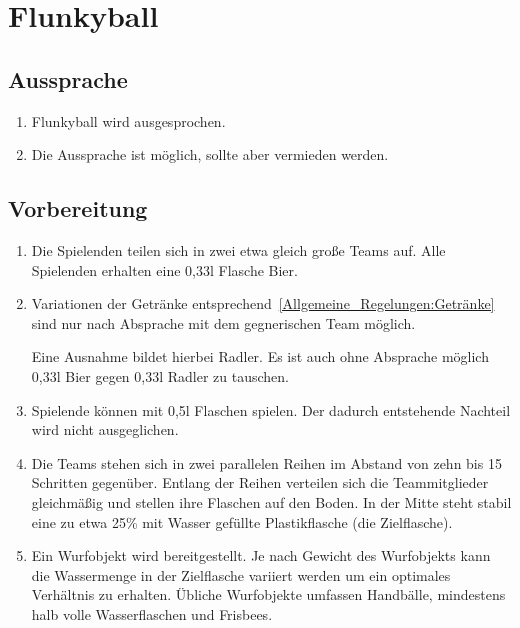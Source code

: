 \chapter{Flunkyball}
\section{Aussprache}
\begin{enumerate}[label={(\arabic*)}]
    \item
    Flunkyball wird  ausgesprochen.

    \item
    Die Aussprache  ist möglich, sollte aber vermieden werden.
\end{enumerate}

\section{Vorbereitung}
\begin{enumerate}[label={(\arabic*)}]
    \item
    Die Spielenden teilen sich in zwei etwa gleich große Teams auf.
    Alle Spielenden erhalten eine 0,33l Flasche Bier.

    \item Variationen der Getränke entsprechend~\ref{Allgemeine_Regelungen:Getränke} sind nur nach Absprache mit dem gegnerischen Team möglich.

    Eine Ausnahme bildet hierbei Radler.
    Es ist auch ohne Absprache möglich 0,33l Bier gegen 0,33l Radler zu tauschen.

    \item
    Spielende können mit 0,5l Flaschen spielen. Der dadurch entstehende Nachteil wird nicht ausgeglichen.

    \item
    Die Teams stehen sich in zwei parallelen Reihen im Abstand von zehn bis 15 Schritten gegenüber.
    Entlang der Reihen verteilen sich die Teammitglieder gleichmäßig und stellen ihre Flaschen auf den Boden.
    In der Mitte steht stabil eine zu etwa 25\% mit Wasser gefüllte Plastikflasche (die Zielflasche).

    \item
    Ein Wurfobjekt wird bereitgestellt.
    Je nach Gewicht des Wurfobjekts kann die Wassermenge in der Zielflasche variiert werden um ein optimales Verhältnis zu erhalten.
    Übliche Wurfobjekte umfassen Handbälle, mindestens halb volle Wasserflaschen und Frisbees.
\end{enumerate}


